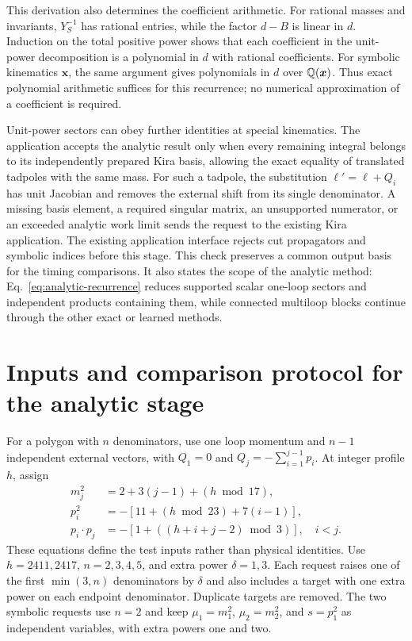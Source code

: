 This derivation also determines the coefficient arithmetic. For rational masses and invariants, $Y_S^{-1}$ has rational entries, while the factor $d-B$ is linear in $d$. Induction on the total positive power shows that each coefficient in the unit-power decomposition is a polynomial in $d$ with rational coefficients. For symbolic kinematics $\boldsymbol x$, the same argument gives polynomials in $d$ over $\mathbb Q(\boldsymbol x)$. Thus exact polynomial arithmetic suffices for this recurrence; no numerical approximation of a coefficient is required.

Unit-power sectors can obey further identities at special kinematics. The application accepts the analytic result only when every remaining integral belongs to its independently prepared Kira basis, allowing the exact equality of translated tadpoles with the same mass. For such a tadpole, the substitution $\ell'=\ell+Q_i$ has unit Jacobian and removes the external shift from its single denominator. A missing basis element, a required singular matrix, an unsupported numerator, or an exceeded analytic work limit sends the request to the existing Kira application. The existing application interface rejects cut propagators and symbolic indices before this stage. This check preserves a common output basis for the timing comparisons. It also states the scope of the analytic method: Eq.~\eqref{eq:analytic-recurrence} reduces supported scalar one-loop sectors and independent products containing them, while connected multiloop blocks continue through the other exact or learned methods.

\section{Inputs and comparison protocol for the analytic stage}
\label{app:analytic-inputs}
For a polygon with $n$ denominators, use one loop momentum and $n-1$ independent external vectors, with $Q_1=0$ and $Q_j=-\sum_{i=1}^{j-1}p_i$. At integer profile $h$, assign
\begin{align}
 m_j^2&=2+3(j-1)+(h\bmod17),\\
 p_i^2&=-[11+(h\bmod23)+7(i-1)],\\
 p_i\cdot p_j&=-[1+((h+i+j-2)\bmod3)],\quad i<j.
\end{align}
These equations define the test inputs rather than physical identities. Use $h=2411,2417$, $n=2,3,4,5$, and extra power $\delta=1,3$. Each request raises one of the first $\min(3,n)$ denominators by $\delta$ and also includes a target with one extra power on each endpoint denominator. Duplicate targets are removed. The two symbolic requests use $n=2$ and keep $\mu_1=m_1^2$, $\mu_2=m_2^2$, and $s=p_1^2$ as independent variables, with extra powers one and two.

